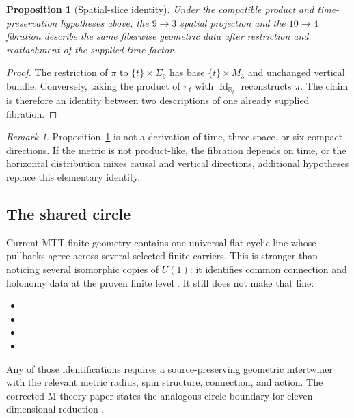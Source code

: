 \documentclass[11pt]{article}
\newtheorem{proposition}[theorem]{Proposition}
\theoremstyle{definition}
\theoremstyle{remark}
\newtheorem{remark}[theorem]{Remark}
\newcommand{\Id}{\operatorname{Id}}
\let\MTToriginalitem\item
\renewcommand{\item}{\par\MTToriginalitem}
\begin{document}
\begin{proposition}[Spatial-slice identity]
\label{prop:slice}
Under the compatible product and time-preservation hypotheses above, the
\(9\to3\) spatial projection and the \(10\to4\) fibration describe the same
fiberwise geometric data after restriction and reattachment of the supplied
time factor.
\end{proposition}

\begin{proof}
The restriction of \(\pi\) to
\(\{t\}\times\Sigma_9\) has base
\(\{t\}\times M_3\) and unchanged vertical bundle.  Conversely, taking the
product of \(\pi_t\) with \(\Id_{\mathbb R_t}\) reconstructs \(\pi\).  The
claim is therefore an identity between two descriptions of one already
supplied fibration.
\end{proof}

\begin{remark}
Proposition~\ref{prop:slice} is not a derivation of time, three-space, or six compact
directions.  If the metric is not product-like, the fibration depends on
time, or the horizontal distribution mixes causal and vertical directions,
additional hypotheses replace this elementary identity.
\end{remark}

\subsection{The shared circle}

Current MTT finite geometry contains one universal flat cyclic line whose
pullbacks agree across several selected finite carriers.  This is stronger
than noticing several isomorphic copies of \(U(1)\): it identifies common
connection and holonomy data at the proven finite level
\cite{NeroFoundation}.  It still does not make that line:
\begin{itemize}[leftmargin=2em,itemsep=0.2em]
\item {}
\item {}
\item {}
\item {}
\end{itemize}
Any of those identifications requires a source-preserving geometric
intertwiner with the relevant metric radius, spin structure, connection,
and action.  The corrected M-theory paper states the analogous circle
boundary for eleven-dimensional reduction \cite{NeroMTheory}.
\end{document}
